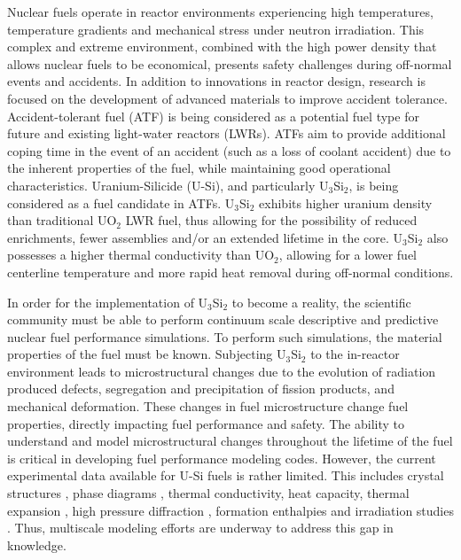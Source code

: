\documentclass[review]{elsarticle}
\begin{document}
Nuclear fuels operate in reactor environments experiencing high temperatures, temperature gradients and mechanical stress under neutron irradiation.  This complex and extreme environment, combined with the high power density that allows nuclear fuels to be economical, presents safety challenges during off-normal events and accidents.  In addition to innovations in reactor design, research is focused on the development of advanced materials \cite{zinkle2016} to improve accident tolerance.  Accident-tolerant fuel (ATF) \cite{zinkle2014} is being considered as a potential fuel type for future and existing light-water reactors (LWRs).  ATFs aim to provide additional coping time in the event of an accident (such as a loss of coolant accident) due to the inherent properties of the fuel, while maintaining good operational characteristics.  Uranium-Silicide (U-Si), and particularly U$_{3}$Si$_{2}$, is being considered as a fuel candidate in ATFs.  U$_{3}$Si$_{2}$ exhibits higher uranium density than traditional UO$_{2}$ LWR fuel, thus allowing for the possibility of reduced enrichments, fewer assemblies and/or an extended lifetime in the core.  U$_{3}$Si$_{2}$ also possesses a higher thermal conductivity than UO$_{2}$, allowing for a lower fuel centerline temperature and more rapid heat removal during off-normal conditions.  

In order for the implementation of U$_{3}$Si$_{2}$ to become a reality, the scientific community must be able to perform continuum scale descriptive and predictive nuclear fuel performance simulations.  To perform such simulations, the material properties of the fuel must be known.  Subjecting U$_{3}$Si$_{2}$ to the in-reactor environment leads to microstructural changes due to the evolution of radiation produced defects, segregation and precipitation of fission products, and mechanical deformation. These changes in fuel microstructure change fuel properties, directly impacting fuel performance and safety.  The ability to understand and model microstructural changes throughout the lifetime of the fuel is critical in developing fuel performance modeling codes.  However, the current experimental data available for U-Si fuels is rather limited.   This includes crystal structures \cite{zachariasen1949, remschnig1992}, phase diagrams \cite{massalski1990}, thermal conductivity, heat capacity, thermal expansion \cite{white2015, shimizu1965}, high pressure diffraction \cite{yagoubi2013}, formation enthalpies \cite{gross1962, ohare1975, alcock1962, rand1963, berche2009} and irradiation studies \cite{shimizu1965, finlay2002}.  Thus, multiscale modeling efforts are underway to address this gap in knowledge.
\end{document}
